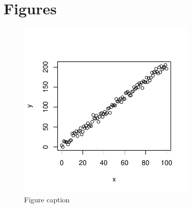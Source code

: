 \documentclass[utf8]{frontiersSCNS}
\begin{document}
\hypertarget{figures}{%
\section*{Figures}\label{figures}}

\begin{figure}

{\centering \includegraphics[width=85mm,height=85mm]{frontiersTest_files/figure-latex/Figure-1-1} 

}

\caption{Figure caption}\label{fig:Figure-1}
\end{figure}
\end{document}
